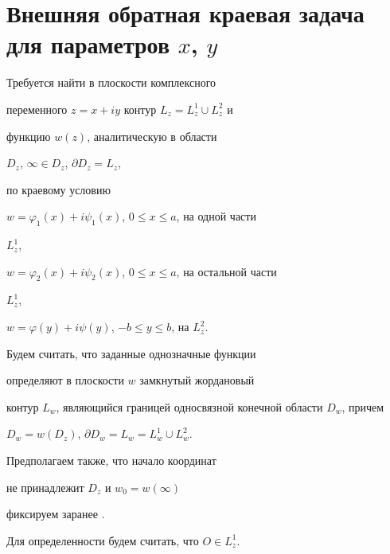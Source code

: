 \maketitle


\label{begin}








\section{Внешняя обратная краевая задача для параметров $x$, $y$}





Требуется найти в плоскости комплексного


переменного $z=x+iy$ контур $L_{z}=L_{z}^{1}\cup L_{z}^{2}$ и 


функцию $w(z)$, аналитическую в области


$D_{z}$, $\infty\in D_z$, $\partial D_z=L_z$,


по краевому условию 





$w=\varphi_{1}(x)+i\psi_{1}(x)$, $0\leq x\leq a$, на одной части


$L_{z}^{1}$,





$w=\varphi_{2}(x)+i\psi_{2}(x)$, $0\leq x\leq a$, на остальной части


$L_{z}^{1}$,





$w=\varphi(y)+i\psi(y)$, $-b\leq y\leq b$, на $L_{z}^{2}$.





Будем считать, что заданные однозначные функции 


определяют в плоскости $w$ замкнутый жордановый


контур $L_{w}$, являющийся границей односвязной конечной области $D_w$, причем 


$D_w=w(D_z)$, $\partial D_w=L_w=L_w^1\cup L_w^2$.


Предполагаем также, что начало координат 


не принадлежит $D_z$ и $w_0=w(\infty)$


фиксируем заранее \cite{TN}. 


Для определенности будем считать, что $O\in L^1_z$.





